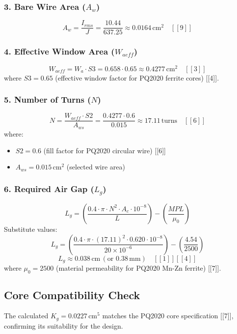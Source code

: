 \documentclass{article}
\begin{document}
	\subsubsection*{3. Bare Wire Area (\(A_w\))}
	\[
	A_w = \frac{I_{rms}}{J} = \frac{10.44}{637.25} \approx \boxed{0.0164 \, \text{cm}^2} \quad [[9]]
	\]
	
	\subsubsection*{4. Effective Window Area (\(W_{aeff}\))}
	\[
	W_{aeff} = W_a \cdot S3 = 0.658 \cdot 0.65 \approx \boxed{0.4277 \, \text{cm}^2} \quad [[3]]
	\]
	where \(S3 = 0.65\) (effective window factor for PQ2020 ferrite cores) [[4]].
	
	\subsubsection*{5. Number of Turns (\(N\))}
	\[
	N = \frac{W_{aeff} \cdot S2}{A_{ws}} = \frac{0.4277 \cdot 0.6}{0.015} \approx \boxed{17.11 \, \text{turns}} \quad [[6]]
	\]
	where:
	\begin{itemize}
		\item \(S2 = 0.6\) (fill factor for PQ2020 circular wire) [[6]]
		\item \(A_{ws} = 0.015 \, \text{cm}^2\) (selected wire area)
	\end{itemize}
	
	\subsubsection*{6. Required Air Gap (\(L_g\))}
	\[
	L_g = \left( \frac{0.4 \cdot \pi \cdot N^2 \cdot A_c \cdot 10^{-8}}{L} \right) - \left( \frac{MPL}{\mu_0} \right)
	\]
	Substitute values:
	\[
	L_g = \left( \frac{0.4 \cdot \pi \cdot (17.11)^2 \cdot 0.620 \cdot 10^{-8}}{20 \times 10^{-6}} \right) - \left( \frac{4.54}{2500} \right)
	\]
	\[
	L_g \approx \boxed{0.038 \, \text{cm} \, (\text{or } 0.38 \, \text{mm})} \quad [[1]][[4]]
	\]
	where \(\mu_0 = 2500\) (material permeability for PQ2020 Mn-Zn ferrite) [[7]].
	
	\subsection*{Core Compatibility Check}
	The calculated \(K_g = 0.0227 \, \text{cm}^5\) matches the PQ2020 core specification [[7]], confirming its suitability for the design.
	
\end{document}
